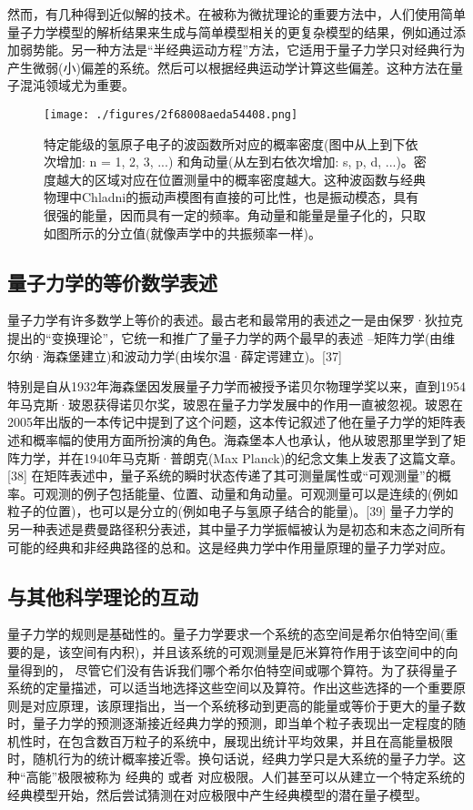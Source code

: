 然而，有几种得到近似解的技术。在被称为微扰理论的重要方法中，人们使用简单量子力学模型的解析结果来生成与简单模型相关的更复杂模型的结果，例如通过添加弱势能。另一种方法是“半经典运动方程”方法，它适用于量子力学只对经典行为产生微弱(小)偏差的系统。然后可以根据经典运动学计算这些偏差。这种方法在量子混沌领域尤为重要。

\begin{figure}[ht]
\centering
\texttt{[image: ./figures/2f68008aeda54408.png]}
\caption{特定能级的氢原子电子的波函数所对应的概率密度(图中从上到下依次增加: n = 1, 2, 3, ...) 和角动量(从左到右依次增加: s, p, d, ...)。密度越大的区域对应在位置测量中的概率密度越大。这种波函数与经典物理中Chladni的振动声模图有直接的可比性，也是振动模态，具有很强的能量，因而具有一定的频率。角动量和能量是量子化的，只取如图所示的分立值(就像声学中的共振频率一样)。} \label{fig_LZLX_3}
\end{figure}

\subsection{量子力学的等价数学表述}
量子力学有许多数学上等价的表述。最古老和最常用的表述之一是由保罗·狄拉克提出的“变换理论”，它统一和推广了量子力学的两个最早的表述 –矩阵力学(由维尔纳·海森堡建立)和波动力学(由埃尔温·薛定谔建立)。[37]

特别是自从1932年海森堡因发展量子力学而被授予诺贝尔物理学奖以来，直到1954年马克斯·玻恩获得诺贝尔奖，玻恩在量子力学发展中的作用一直被忽视。玻恩在2005年出版的一本传记中提到了这个问题，这本传记叙述了他在量子力学的矩阵表述和概率幅的使用方面所扮演的角色。海森堡本人也承认，他从玻恩那里学到了矩阵力学，并在1940年马克斯·普朗克(Max Planck)的纪念文集上发表了这篇文章。[38] 在矩阵表述中，量子系统的瞬时状态传递了其可测量属性或“可观测量”的概率。可观测的例子包括能量、位置、动量和角动量。可观测量可以是连续的(例如粒子的位置)，也可以是分立的(例如电子与氢原子结合的能量)。[39] 量子力学的另一种表述是费曼路径积分表述，其中量子力学振幅被认为是初态和末态之间所有可能的经典和非经典路径的总和。这是经典力学中作用量原理的量子力学对应。

\subsection{与其他科学理论的互动}
量子力学的规则是基础性的。量子力学要求一个系统的态空间是希尔伯特空间(重要的是，该空间有内积)，并且该系统的可观测量是厄米算符作用于该空间中的向量得到的， 尽管它们没有告诉我们哪个希尔伯特空间或哪个算符。为了获得量子系统的定量描述，可以适当地选择这些空间以及算符。作出这些选择的一个重要原则是对应原理，该原理指出，当一个系统移动到更高的能量或等价于更大的量子数时，量子力学的预测逐渐接近经典力学的预测，即当单个粒子表现出一定程度的随机性时，在包含数百万粒子的系统中，展现出统计平均效果，并且在高能量极限时，随机行为的统计概率接近零。换句话说，经典力学只是大系统的量子力学。这种“高能”极限被称为 经典的 或者 对应极限。人们甚至可以从建立一个特定系统的经典模型开始，然后尝试猜测在对应极限中产生经典模型的潜在量子模型。

